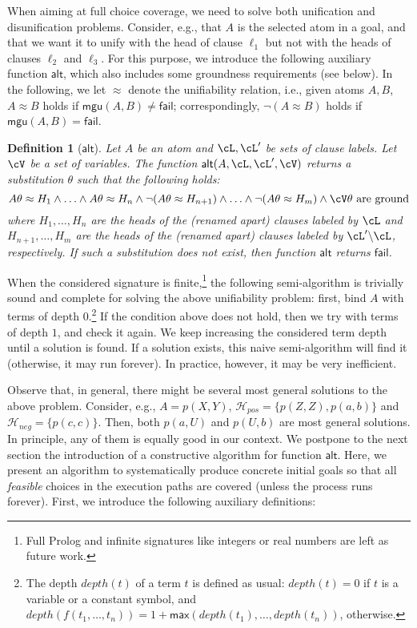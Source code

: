 \documentclass[fleqn]{tlp}
\newtheorem{definition}{Definition} \newtheorem{example}{Example} \newtheorem{lemma}{Lemma} \newtheorem{proposition}{Proposition} \newtheorem{theorem}{Theorem} \newtheorem{corollary}{Corollary}
\newcommand{\alt}{\mathsf{alt}}
\newcommand{\depth}{\mathit{depth}}
\newcommand{\mgu}{\mathsf{mgu}}
\newcommand{\fail}{\mathsf{fail}}
\newcommand{\Hpos}{\mathcal{H}_{\mathit{pos}}}
\newcommand{\Hneg}{\mathcal{H}_{\mathit{neg}}}
\begin{document}
When aiming at full choice coverage, we need to
solve both unification and disunification problems. Consider, e.g.,
that $A$ is the selected atom in a goal, and that we want it to unify
with the head of clause $\ell_1$ but not with the heads of clauses
$\ell_2$ and $\ell_3$. For this purpose, we introduce the following
auxiliary function $\alt$, which also includes some groundness
requirements (see below). In the following, we let $\approx$ denote
the unifiability relation, i.e., given atoms $A,B$, $A\approx B$ holds
if $\mgu(A,B)\neq\fail$; correspondingly, $\neg(A\approx B)$ holds if
$\mgu(A,B)=\fail$.

\begin{definition}[$\alt$] \label{def:alt}
  Let $A$ be an atom and $\cL,\cL'$ be sets of clause labels. Let
  $\cV$ be a set of variables.  The function $\alt(A,\cL,\cL',\cV)$
  returns a substitution $\theta$ such that the following holds:
  \[
  A\theta\approx H_1\wedge\ldots\wedge A\theta\approx H_n\wedge
  \neg(A\theta\approx H_{n+1})\wedge\ldots\wedge \neg(A\theta\approx
  H_m)
  \wedge \cV\theta~\mbox{are ground}
  \]
  where $H_1,\ldots,H_n$ are the heads of the (renamed apart) clauses
  labeled by $\cL$ and $H_{n+1},\ldots,H_m$ are the heads of the
  (renamed apart) clauses labeled by $\cL'\backslash\cL$,
  respectively. 
If such a substitution does not exist, then function $\alt$ returns
  $\fail$.
\end{definition}
When the considered signature is finite,\!\footnote{Full Prolog and
  infinite signatures like integers or real numbers are left as future
  work.}  the following semi-algorithm is trivially sound and complete
for solving the above unifiability problem: first, bind $A$ with terms
of depth $0$.\footnote{The depth $\depth(t)$ of a term $t$ is defined
  as usual: $\depth(t) = 0$ if $t$ is a variable or a constant symbol,
  and $\depth(f(t_1,\ldots,t_n)) =
  1+\mathsf{max}(\depth(t_1),\ldots,\depth(t_n))$, otherwise.} If the
condition above does not hold, then we try with terms of depth $1$,
and check it again. We keep increasing the considered term depth until
a solution is found. If a solution exists, this naive semi-algorithm will
find it (otherwise, it may run forever). 
In practice, however, it may be very inefficient.

Observe that, in general, there might be several most general solutions to
the above problem. Consider, e.g., $A=p(X,Y)$,
$\Hpos=\{p(Z,Z),p(a,b)\}$ and $\Hneg=\{p(c,c)\}$. Then, both $p(a,U)$
and $p(U,b)$ are most general solutions.  In principle, any of them is
equally good in our context.
We postpone to the next section the introduction of a constructive
algorithm for function $\alt$.  Here, we present an algorithm to
systematically produce concrete initial goals so that all
\emph{feasible} choices in the execution paths are covered (unless the
process runs forever).
First, we introduce the following auxiliary definitions:
\end{document}
